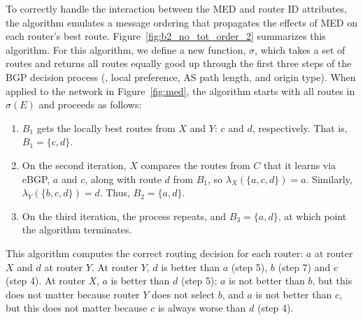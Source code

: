 To correctly handle the interaction between the MED and router ID
attributes, the algorithm 
emulates a
message ordering that propagates the effects of MED on each
router's best route.
Figure~\ref{fig:b2_no_tot_order_2} summarizes this algorithm.
For this algorithm, we define a new function, $\sigma$, which takes a set
of routes and 
returns all routes equally good up through the first three steps of the
BGP decision process (\ie, local preference, AS path length, and origin
type).
When applied to the
network in Figure~\ref{fig:med}, the algorithm starts with all routes in
$\sigma(E)$
and proceeds as follows:





\begin{enumerate}
\itemsep=-1pt
\item $B_1$ gets the locally best routes from $X$ and $Y$: $c$ and $d$,
  respectively. That is, $B_1 = \{c,d\}$.
\item On the second iteration, $X$ compares the routes from $C$ that it
  learns via eBGP, $a$ and $c$, along with route $d$ from $B_1$, so
  $\lambda_X(\{a,c,d\}) = a$.  Similarly, $\lambda_Y(\{b,c,d\}) = d$.
  Thus, $B_2 = \{a, d\}$.
\item On the third iteration, the process repeats, and  $B_3 = \{a,
  d\}$, at which point the algorithm terminates.
\end{enumerate}

\noindent
This algorithm computes the correct routing decision for each router:
$a$ at router $X$ and $d$ at router $Y$.  At router $Y$, $d$ is better
than $a$ (step 5), $b$ (step 7) and $c$ (step 4).  At router $X$, $a$
is better than $d$ (step 5); $a$ is not better than
$b$, but this does not matter because router $Y$ does not select $b$,
and $a$ is not better than $c$, but this does not matter because $c$ is
always worse than $d$ (step 4).

